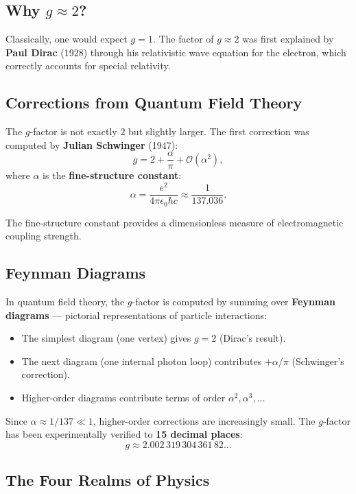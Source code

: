 \documentclass[11pt,a4paper]{article}
\theoremstyle{definition}
\theoremstyle{plain}
\theoremstyle{remark}
\begin{document}
\subsection{Why $g \approx 2$?}

Classically, one would expect $g = 1$. The factor of $g \approx 2$ was first explained by \textbf{Paul Dirac} (1928) through his relativistic wave equation for the electron, which correctly accounts for special relativity.

\subsection{Corrections from Quantum Field Theory}

The $g$-factor is not exactly $2$ but slightly larger. The first correction was computed by \textbf{Julian Schwinger} (1947):
\[
    g = 2 + \frac{\alpha}{\pi} + \mathcal{O}(\alpha^2),
\]
where $\alpha$ is the \textbf{fine-structure constant}:
\[
    \alpha = \frac{e^2}{4\pi\epsilon_0\hbar c} \approx \frac{1}{137.036}.
\]

The fine-structure constant provides a dimensionless measure of electromagnetic coupling strength.

\subsection{Feynman Diagrams}

In quantum field theory, the $g$-factor is computed by summing over \textbf{Feynman diagrams} --- pictorial representations of particle interactions:
\begin{itemize}
    \item The simplest diagram (one vertex) gives $g = 2$ (Dirac's result).
    \item The next diagram (one internal photon loop) contributes $+\alpha/\pi$ (Schwinger's correction).
    \item Higher-order diagrams contribute terms of order $\alpha^2, \alpha^3, \ldots$
\end{itemize}

Since $\alpha \approx 1/137 \ll 1$, higher-order corrections are increasingly small. The $g$-factor has been experimentally verified to \textbf{15 decimal places}:
\[
    g \approx 2.002\,319\,304\,361\,82\ldots
\]

\subsection{The Four Realms of Physics}
\end{document}
